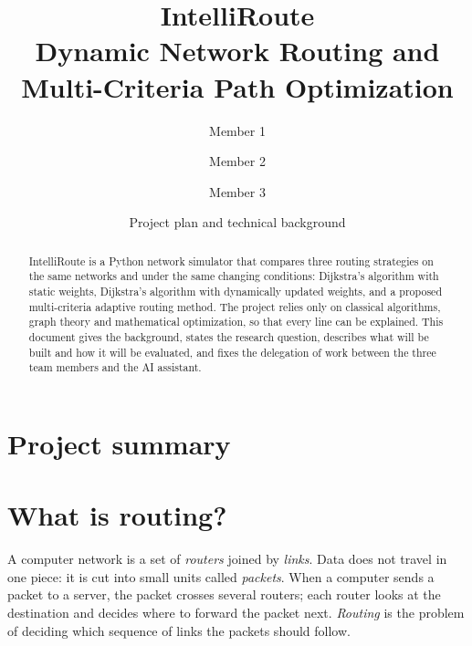 \documentclass[11pt,a4paper]{article}
\title{\textbf{IntelliRoute}\\[4pt]\large Dynamic Network Routing and Multi-Criteria Path Optimization}
\author{Member 1 \and Member 2 \and Member 3}
\date{Project plan and technical background}
\begin{document}
\maketitle

\begin{abstract}
IntelliRoute is a Python network simulator that compares three routing strategies on the same
networks and under the same changing conditions: Dijkstra's algorithm with static weights,
Dijkstra's algorithm with dynamically updated weights, and a proposed multi-criteria adaptive
routing method. The project relies only on classical algorithms, graph theory and mathematical
optimization, so that every line can be explained. This document gives the background, states the
research question, describes what will be built and how it will be evaluated, and fixes the
delegation of work between the three team members and the AI assistant.
\end{abstract}

\tableofcontents

\section*{Project summary}
\begin{center}
\end{center}

\section{What is routing?}
A computer network is a set of \emph{routers} joined by \emph{links}. Data does not travel in one
piece: it is cut into small units called \emph{packets}. When a computer sends a packet to a
server, the packet crosses several routers; each router looks at the destination and decides where
to forward the packet next. \emph{Routing} is the problem of deciding which sequence of links the
packets should follow.
\end{document}
